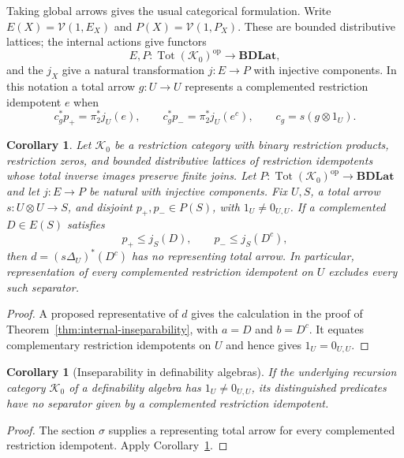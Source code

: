 \documentclass[11pt]{article}
\newtheorem{corollary}[theorem]{Corollary}
\theoremstyle{definition}
\theoremstyle{remark}
\begin{document}
Taking global arrows gives the usual categorical formulation.
Write $E(X)=\mathscr V(1,E_X)$ and
$P(X)=\mathscr V(1,P_X)$. These are bounded distributive lattices;
the internal actions give functors
\[
 E,P:\operatorname{Tot}(\mathcal K_0)^{\mathrm{op}}
       \longrightarrow\mathbf{BDLat},
\]
and the $j_X$ give a natural transformation $j:E\to P$ with
injective components. In this notation a total arrow
$g:U\to U$ represents a complemented restriction idempotent $e$ when
\begin{equation}\label{eq:integration-rows}
 c_g^*p_+=\pi_2^*j_U(e),\qquad
 c_g^*p_-=\pi_2^*j_U(e^c),
 \qquad c_g=s(g\otimes1_U).
\end{equation}

\begin{corollary}\label{thm:integration-diagonal}
Let $\mathcal K_0$ be a restriction category with binary restriction
products, restriction zeros, and bounded distributive lattices of restriction idempotents whose total inverse images preserve finite joins.
Let $P:\operatorname{Tot}(\mathcal K_0)^{\mathrm{op}}\to\mathbf{BDLat}$
and let $j:E\to P$ be natural with injective components.
Fix $U,S$, a total arrow $s:U\otimes U\to S$, and disjoint
$p_+,p_-\in P(S)$, with $1_U\ne0_{U,U}$.
If a complemented $D\in E(S)$ satisfies
\[
 p_+\leq j_S(D),\qquad p_-\leq j_S(D^c),
\]
then $d=(s\Delta_U)^*(D^c)$ has no representing total arrow.
In particular, representation of every complemented restriction idempotent on
$U$ excludes every such separator.
\end{corollary}
\begin{proof}
A proposed representative of $d$ gives the calculation in the
proof of Theorem~\ref{thm:internal-inseparability}, with
$a=D$ and $b=D^c$. It equates complementary restriction idempotents on $U$
and hence gives $1_U=0_{U,U}$.
\end{proof}

\begin{corollary}[Inseparability in definability algebras]
\label{cor:definability-algebra-inseparability}
If the underlying recursion category $\mathcal K_0$ of a
definability algebra has $1_U\ne0_{U,U}$, its distinguished predicates have no
separator given by a complemented restriction idempotent.
\end{corollary}
\begin{proof}
The section $\sigma$ supplies a representing total arrow for
every complemented restriction idempotent. Apply
Corollary~\ref{thm:integration-diagonal}.
\end{proof}
\end{document}
